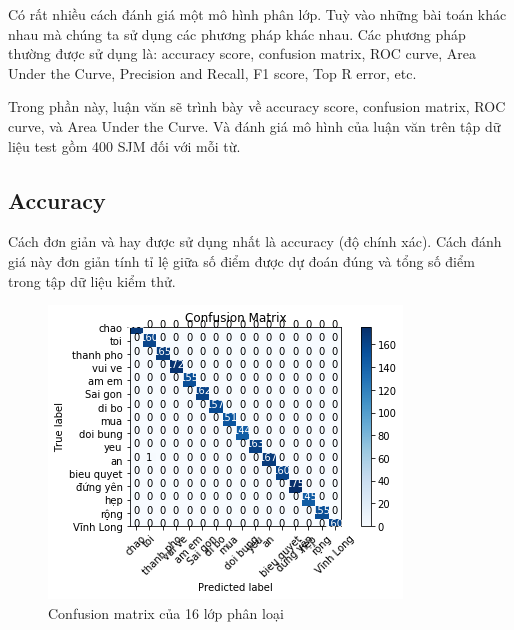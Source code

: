 Có rất nhiều cách đánh giá một mô hình phân lớp. Tuỳ vào những bài toán khác nhau mà chúng ta sử dụng các phương pháp khác nhau. Các phương pháp thường được sử dụng là: accuracy score, confusion matrix, ROC curve, Area Under the Curve, Precision and Recall, F1 score, Top R error, etc.

Trong phần này, luận văn sẽ trình bày về accuracy score, confusion matrix, ROC curve, và Area Under the Curve. Và đánh giá mô hình của luận văn trên tập dữ liệu test gồm 400 SJM đối với mỗi từ.

\subsection{Accuracy}
Cách đơn giản và hay được sử dụng nhất là accuracy (độ chính xác). Cách đánh giá này đơn giản tính tỉ lệ giữa số điểm được dự đoán đúng và tổng số điểm trong tập dữ liệu kiểm thử.
\FloatBarrier
\begin{figure}[htp]
\begin{center}
\includegraphics[scale=1]{chap5/c5_figs/confusion_matrix.png}
\end{center}
\caption{Confusion matrix của 16 lớp phân loại}
\label{fig:pipelineS}
\end{figure}
\FloatBarrier